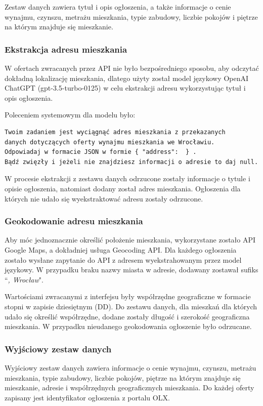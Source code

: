 \documentclass[10pt]{article}
\begin{document}
Zestaw danych zawiera tytuł i opis ogłoszenia, a także informacje o cenie wynajmu, czynszu, metrażu mieszkania, typie zabudowy, liczbie pokojów i piętrze na którym znajduje się mieszkanie.

\subsubsection{Ekstrakcja adresu mieszkania}

W ofertach zwracanych przez API nie było bezpośredniego sposobu, aby odczytać dokładną lokalizację mieszkania, dlatego użyty został model językowy OpenAI ChatGPT (gpt-3.5-turbo-0125) w celu ekstrakcji adresu wykorzystując tytuł i opis ogłoszenia.


Poleceniem systemowym dla modelu było:
\begin{verbatim}
Twoim zadaniem jest wyciągnąć adres mieszkania z przekazanych
danych dotyczących oferty wynajmu mieszkania we Wrocławiu. 
Odpowiadaj w formacie JSON w formie { "address":  } . 
Bądź zwięzły i jeżeli nie znajdziesz informacji o adresie to daj null.
\end{verbatim}

W procesie ekstrakcji z zestawu danych odrzucone zostały informacje o tytule i opisie ogłoszenia, natomiast dodany został adres mieszkania. 
Ogłoszenia dla których nie udało się wyekstraktować adresu zostały odrzucone.

\subsubsection{Geokodowanie adresu mieszkania}
Aby móc jednoznacznie określić położenie mieszkania, wykorzystane zostało API Google Maps, a dokładniej usługa Geocoding API. 
Dla każdego ogłoszenia zostało wysłane zapytanie do API z adresem wyekstrahowanym przez model językowy. 
W przypadku braku nazwy miasta w adresie, dodawany zostawał sufiks ``\textit{, Wrocław}".

Wartościami zwracanymi z interfejsu były współrzędne geograficzne w formacie stopni w zapisie dziesiętnym (DD). 
Do zestawu danych, dla mieszkań dla których udało się określić współrzędne, dodane zostały długość i szerokość geograficzna mieszkania. 
W przypadku nieudanego geokodowania ogłoszenie było odrzucane.  

\subsubsection{Wyjściowy zestaw danych}
Wyjściowy zestaw danych zawiera informacje o cenie wynajmu, czynszu, metrażu mieszkania, typie zabudowy, liczbie pokojów, 
piętrze na którym znajduje się mieszkanie, adresie i współrzędnych geograficznych mieszkania. 
Do każdej oferty zapisany jest identyfikator ogłoszenia z portalu OLX.
\end{document}
